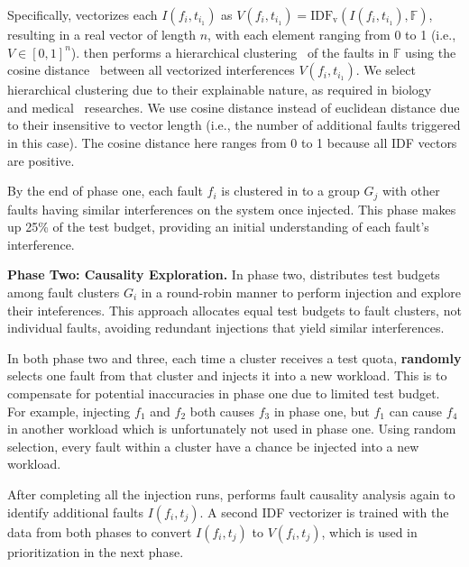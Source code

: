 Specifically, 
\tool vectorizes each 
$I(f_i, t_{i_1})$ as 
$V(f_i, t_{i_1})=\mathrm{IDF_v}(I(f_i, t_{i_1}), \mathbb{F})$, 
resulting in a real vector of length $n$, with each element ranging from 0 to 1 (i.e., $V \in [0,1]^n$).
\tool then performs 
a hierarchical clustering~\cite{kaufman2009finding} of the faults 
in $\mathbb F$ using the cosine distance~\cite{schutze2008introduction} between all vectorized interferences $V(f_i, t_{i_1})$. 
We select hierarchical clustering due to their explainable nature, 
as required in biology~\cite{krause2005large} and medical~\cite{zhang2017hierarchical} researches. 
We use cosine distance instead of euclidean distance due to their insensitive to vector length (i.e., the number of additional faults triggered in this case). The cosine distance here ranges from 0 to 1 because all IDF vectors are positive.

By the end of phase one, each fault $f_i$ is clustered in to a group $G_j$ with other faults having similar interferences on the system once injected.
This phase 
makes up 25\% of the test budget, 
providing an initial understanding of each fault's interference.



\textbf{Phase Two: Causality Exploration.} 
In phase two, 
\tool distributes test budgets among 
fault clusters $G_i$ in a round-robin manner 
to perform injection and explore their inteferences.  
This approach allocates equal test budgets to fault clusters, 
not individual faults, 
avoiding redundant injections that yield similar interferences. 

In both phase two and three, 
each time a cluster receives a test quota, 
\tool \textbf{randomly} selects one fault from that cluster 
and injects it into a new workload. 
This is to compensate for potential inaccuracies in phase one 
due to limited test budget. 
For example, 
injecting $f_1$ and $f_2$ both causes $f_3$ in phase one, 
but $f_1$ can cause $f_4$ in 
another workload 
which is unfortunately not used in phase one. 
Using random selection, every fault within a cluster have a chance be injected into a new workload.

After completing all the injection runs, \tool performs fault causality analysis again to identify additional faults $I(f_i, t_j)$. 
A second IDF vectorizer is trained with the data from both phases to convert $I(f_i, t_j)$ to $V(f_i, t_j)$, 
which is used in prioritization in the next phase. 

